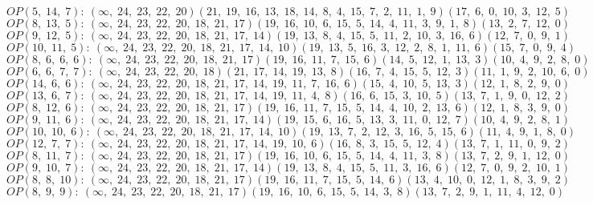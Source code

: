 $OP(5, \;14, \;7): \:(\infty, \;24, \;23, \;22, \;20)(21, \;19, \;16, \;13, \;18, \;14, \;8, \;4, \;15, \;7, \;2, \;11, \;1, \;9)(17, \;6, \;0, \;10, \;3, \;12, \;5)$\\
$OP(8, \;13, \;5): \:(\infty, \;24, \;23, \;22, \;20, \;18, \;21, \;17)(19, \;16, \;10, \;6, \;15, \;5, \;14, \;4, \;11, \;3, \;9, \;1, \;8)(13, \;2, \;7, \;12, \;0)$\\
$OP(9, \;12, \;5): \:(\infty, \;24, \;23, \;22, \;20, \;18, \;21, \;17, \;14)(19, \;13, \;8, \;4, \;15, \;5, \;11, \;2, \;10, \;3, \;16, \;6)(12, \;7, \;0, \;9, \;1)$\\
$OP(10, \;11, \;5): \:(\infty, \;24, \;23, \;22, \;20, \;18, \;21, \;17, \;14, \;10)(19, \;13, \;5, \;16, \;3, \;12, \;2, \;8, \;1, \;11, \;6)(15, \;7, \;0, \;9, \;4)$\\
$OP(8, \;6, \;6, \;6): \:(\infty, \;24, \;23, \;22, \;20, \;18, \;21, \;17)(19, \;16, \;11, \;7, \;15, \;6)(14, \;5, \;12, \;1, \;13, \;3)(10, \;4, \;9, \;2, \;8, \;0)$\\
$OP(6, \;6, \;7, \;7): \:(\infty, \;24, \;23, \;22, \;20, \;18)(21, \;17, \;14, \;19, \;13, \;8)(16, \;7, \;4, \;15, \;5, \;12, \;3)(11, \;1, \;9, \;2, \;10, \;6, \;0)$\\
$OP(14, \;6, \;6): \:(\infty, \;24, \;23, \;22, \;20, \;18, \;21, \;17, \;14, \;19, \;11, \;7, \;16, \;6)(15, \;4, \;10, \;5, \;13, \;3)(12, \;1, \;8, \;2, \;9, \;0)$\\
$OP(13, \;6, \;7): \:(\infty, \;24, \;23, \;22, \;20, \;18, \;21, \;17, \;14, \;19, \;11, \;4, \;8)(16, \;6, \;15, \;3, \;10, \;5)(13, \;7, \;1, \;9, \;0, \;12, \;2)$\\
$OP(8, \;12, \;6): \:(\infty, \;24, \;23, \;22, \;20, \;18, \;21, \;17)(19, \;16, \;11, \;7, \;15, \;5, \;14, \;4, \;10, \;2, \;13, \;6)(12, \;1, \;8, \;3, \;9, \;0)$\\
$OP(9, \;11, \;6): \:(\infty, \;24, \;23, \;22, \;20, \;18, \;21, \;17, \;14)(19, \;15, \;6, \;16, \;5, \;13, \;3, \;11, \;0, \;12, \;7)(10, \;4, \;9, \;2, \;8, \;1)$\\
$OP(10, \;10, \;6): \:(\infty, \;24, \;23, \;22, \;20, \;18, \;21, \;17, \;14, \;10)(19, \;13, \;7, \;2, \;12, \;3, \;16, \;5, \;15, \;6)(11, \;4, \;9, \;1, \;8, \;0)$\\
$OP(12, \;7, \;7): \:(\infty, \;24, \;23, \;22, \;20, \;18, \;21, \;17, \;14, \;19, \;10, \;6)(16, \;8, \;3, \;15, \;5, \;12, \;4)(13, \;7, \;1, \;11, \;0, \;9, \;2)$\\
$OP(8, \;11, \;7): \:(\infty, \;24, \;23, \;22, \;20, \;18, \;21, \;17)(19, \;16, \;10, \;6, \;15, \;5, \;14, \;4, \;11, \;3, \;8)(13, \;7, \;2, \;9, \;1, \;12, \;0)$\\
$OP(9, \;10, \;7): \:(\infty, \;24, \;23, \;22, \;20, \;18, \;21, \;17, \;14)(19, \;13, \;8, \;4, \;15, \;5, \;11, \;3, \;16, \;6)(12, \;7, \;0, \;9, \;2, \;10, \;1)$\\
$OP(8, \;8, \;10): \:(\infty, \;24, \;23, \;22, \;20, \;18, \;21, \;17)(19, \;16, \;11, \;7, \;15, \;5, \;14, \;6)(13, \;4, \;10, \;0, \;12, \;1, \;8, \;3, \;9, \;2)$\\
$OP(8, \;9, \;9): \:(\infty, \;24, \;23, \;22, \;20, \;18, \;21, \;17)(19, \;16, \;10, \;6, \;15, \;5, \;14, \;3, \;8)(13, \;7, \;2, \;9, \;1, \;11, \;4, \;12, \;0)$\\

